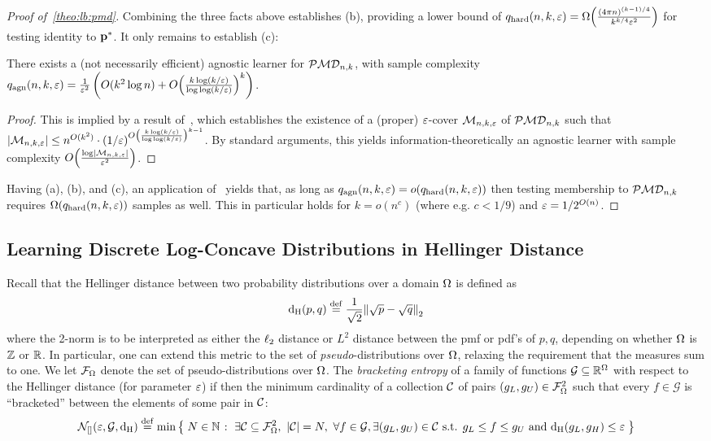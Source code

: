 \begin{proof}[Proof of~\cref{theo:lb:pmd}]
\noindent Combining the three facts above establishes (b), providing a lower bound of $q_{\rm hard}(n,k,\eps) = \bigOmega{ \frac{ (4\pi n)^{(k-1)/4}}{k^{k/4}\eps^2} }$ for testing identity to $\p^\ast$. It only remains to establish (c):

\begin{lemma}
There exists a (not necessarily efficient) agnostic learner for $\classpmd[n]{k}$, with sample complexity $q_{\rm agn}(n,k,\eps) = \frac{1}{\eps^2}\left( O(k^2\log n)+ \bigO{ \frac{k\log(k/\eps)}{\log\log(k/\eps)} }^k \right)$.
\end{lemma}
\begin{proof}
This is implied by a result of~\cite{DKS:15c}, which establishes the existence of a (proper) $\eps$-cover $\mathcal{M}_{n,k,\eps}$ of $\classpmd[n]{k}$ such that
$
    \abs{ \mathcal{M}_{n,k,\eps} } \leq n^{O(k^2)}\cdot (1/\eps)^{\bigO{ \frac{k\log(k/\eps)}{\log\log(k/\eps)} }^{k-1}}
$. By standard arguments, this yields information-theoretically an agnostic learner with sample complexity $\bigO{\frac{\log\abs{ \mathcal{M}_{n,k,\eps} } }{\eps^2}}$.
\end{proof}

Having (a), (b), and (c), an application of~\cite[Theorem 18]{CDGR:16} yields that, as long as 
$
  q_{\rm agn}(n,k,\eps) = o( q_{\rm hard}(n,k,\eps) )
$ then testing membership to $\classpmd[n]{k}$ requires $\bigOmega{q_{\rm hard}(n,k,\eps)}$ samples as well. This in particular holds for $k = o(n^{c})$ (where e.g. $c<1/9$) and $\eps = 1/2^{O(n)}$.

\end{proof}

\subsection{Learning Discrete Log-Concave Distributions in Hellinger Distance}\label{appendix:log:concave}

Recall that the Hellinger distance between two probability distributions over a domain $\domain$ is defined as 
\[
\hellinger{p}{q} \eqdef \frac{1}{\sqrt{2}}\normtwo{\sqrt{p}-\sqrt{q}}
\]
where the 2-norm is to be interpreted as either the $\lp[2]$ distance or $L^2$ distance between the pmf or pdf's of $p,q$, depending on whether $\domain$ is $\Z$ or $\R$. In particular, one can extend this metric to the set of \emph{pseudo}-distributions over $\domain$, relaxing the requirement that the measures sum to one. We let $\mathcal{F}_{\domain}$ denote the set of pseudo-distributions over $\domain$. The \emph{bracketing entropy} of a family of functions $\mathcal{G}\subseteq\R^{\domain}$ with respect to the Hellinger distance (for parameter $\eps$) if then the minimum cardinality of a collection $\class$ of pairs $(g_L,g_U)\in \mathcal{F}_{\domain}^2$ such that every $f\in\mathcal{G}$ is ``bracketed'' between the elements of some pair in $\class$:
\[
    \bracketing{\eps}{\mathcal{G}} \eqdef \min\setOfSuchThat{ N\in\N }{ \exists \class \subseteq \mathcal{F}_{\domain}^2,\ \abs{\class}=N,\ \forall f\in\mathcal{G}, \exists (g_L,g_U)\in\class\text{ s.t. } g_L\leq f\leq g_U \text{ and } \hellinger{g_L}{g_H}\leq \eps }
\]

